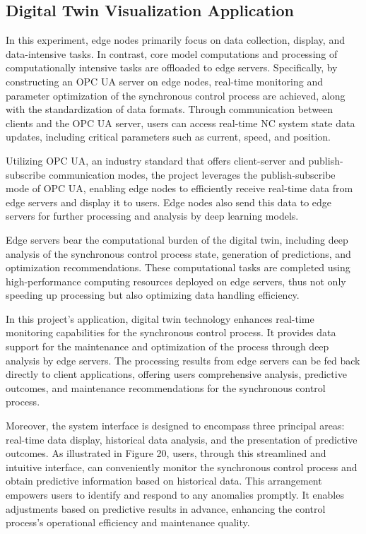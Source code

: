 \documentclass[preprint,12pt]{elsarticle}
\begin{document}
\subsection{Digital Twin Visualization Application}

In this experiment, edge nodes primarily focus on data collection, display, and data-intensive tasks. In contrast, core model computations and processing of computationally intensive tasks are offloaded to edge servers. Specifically, by constructing an OPC UA server on edge nodes, real-time monitoring and parameter optimization of the synchronous control process are achieved, along with the standardization of data formats. Through communication between clients and the OPC UA server, users can access real-time NC system state data updates, including critical parameters such as current, speed, and position.

Utilizing OPC UA, an industry standard that offers client-server and publish-subscribe communication modes, the project leverages the publish-subscribe mode of OPC UA, enabling edge nodes to efficiently receive real-time data from edge servers and display it to users\cite{drahovs2018trends}. Edge nodes also send this data to edge servers for further processing and analysis by deep learning models.

Edge servers bear the computational burden of the digital twin, including deep analysis of the synchronous control process state, generation of predictions, and optimization recommendations. These computational tasks are completed using high-performance computing resources deployed on edge servers, thus not only speeding up processing but also optimizing data handling efficiency.

In this project's application, digital twin technology enhances real-time monitoring capabilities for the synchronous control process. It provides data support for the maintenance and optimization of the process through deep analysis by edge servers. The processing results from edge servers can be fed back directly to client applications, offering users comprehensive analysis, predictive outcomes, and maintenance recommendations for the synchronous control process.

Moreover, the system interface is designed to encompass three principal areas: real-time data display, historical data analysis, and the presentation of predictive outcomes. As illustrated in Figure 20, users, through this streamlined and intuitive interface, can conveniently monitor the synchronous control process and obtain predictive information based on historical data. This arrangement empowers users to identify and respond to any anomalies promptly. It enables adjustments based on predictive results in advance, enhancing the control process's operational efficiency and maintenance quality.
\end{document}
